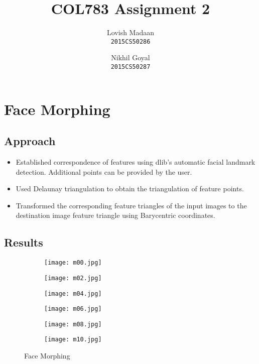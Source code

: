 \documentclass{article}
\title{COL783 Assignment 2}
\date{}
\author{Lovish Madaan \\ \texttt{2015CS50286} \and Nikhil Goyal \\ \texttt{2015CS50287}}
\begin{document}
\maketitle
\section{Face Morphing}
\subsection{Approach}
\begin{itemize}
    \item Established correspondence of features using dlib's automatic facial landmark detection. Additional points can be provided by the user.
    \item Used Delaunay triangulation to obtain the triangulation of feature points.
    \item Transformed the corresponding feature triangles of the input images to the destination image feature triangle using Barycentric coordinates.
\end{itemize}

\subsection{Results}
\begin{figure}[!ht]
\begin{subfigure}{.33\textwidth}
\centering
\texttt{[image: m00.jpg]}
\end{subfigure}
\begin{subfigure}{.33\textwidth}
\centering
\texttt{[image: m02.jpg]}
\end{subfigure}
\begin{subfigure}{.33\textwidth}
\centering
\texttt{[image: m04.jpg]}
\end{subfigure}
\begin{subfigure}{.33\textwidth}
\centering
\texttt{[image: m06.jpg]}
\end{subfigure}
\begin{subfigure}{.33\textwidth}
\centering
\texttt{[image: m08.jpg]}
\end{subfigure}
\begin{subfigure}{.33\textwidth}
\centering
\texttt{[image: m10.jpg]}
\end{subfigure}
\caption{Face Morphing}
\end{figure}
\end{document}
